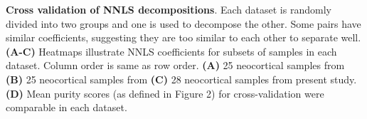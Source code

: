 \textbf{Cross validation of NNLS decompositions}.
 Each dataset is randomly divided into two groups and one is used to decompose the other. Some pairs have similar coefficients, suggesting they are too similar to each other to separate well. \textbf{(A-C)} Heatmaps illustrate NNLS coefficients for subsets of samples in each dataset. Column order is same as row order. \textbf{(A)} 25 neocortical samples from \cite{Tasic_2018} \textbf{(B)} 25 neocortical samples from \cite{Zeisel_2018} \textbf{(C)} 28 neocortical samples from present study. \textbf{(D)} Mean purity scores (as defined in Figure 2) for cross-validation were comparable in each dataset.
 
